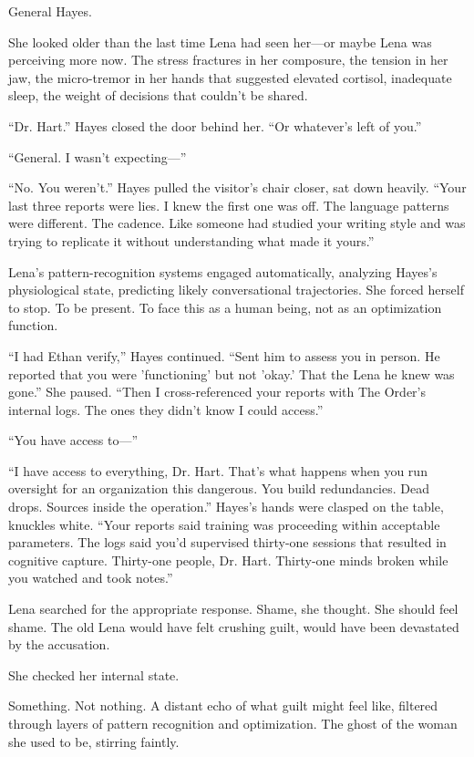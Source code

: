 General Hayes.

She looked older than the last time Lena had seen her—or maybe Lena was perceiving more now. The stress fractures in her composure, the tension in her jaw, the micro-tremor in her hands that suggested elevated cortisol, inadequate sleep, the weight of decisions that couldn't be shared.

``Dr. Hart.'' Hayes closed the door behind her. ``Or whatever's left of you.''

``General. I wasn't expecting—''

``No. You weren't.'' Hayes pulled the visitor's chair closer, sat down heavily. ``Your last three reports were lies. I knew the first one was off. The language patterns were different. The cadence. Like someone had studied your writing style and was trying to replicate it without understanding what made it yours.''

Lena's pattern-recognition systems engaged automatically, analyzing Hayes's physiological state, predicting likely conversational trajectories. She forced herself to stop. To be present. To face this as a human being, not as an optimization function.

``I had Ethan verify,'' Hayes continued. ``Sent him to assess you in person. He reported that you were 'functioning' but not 'okay.' That the Lena he knew was gone.'' She paused. ``Then I cross-referenced your reports with The Order's internal logs. The ones they didn't know I could access.''

``You have access to—''

``I have access to everything, Dr. Hart. That's what happens when you run oversight for an organization this dangerous. You build redundancies. Dead drops. Sources inside the operation.'' Hayes's hands were clasped on the table, knuckles white. ``Your reports said training was proceeding within acceptable parameters. The logs said you'd supervised thirty-one sessions that resulted in cognitive capture. Thirty-one people, Dr. Hart. Thirty-one minds broken while you watched and took notes.''

Lena searched for the appropriate response. Shame, she thought. She should feel shame. The old Lena would have felt crushing guilt, would have been devastated by the accusation.

She checked her internal state.

Something. Not nothing. A distant echo of what guilt might feel like, filtered through layers of pattern recognition and optimization. The ghost of the woman she used to be, stirring faintly.

